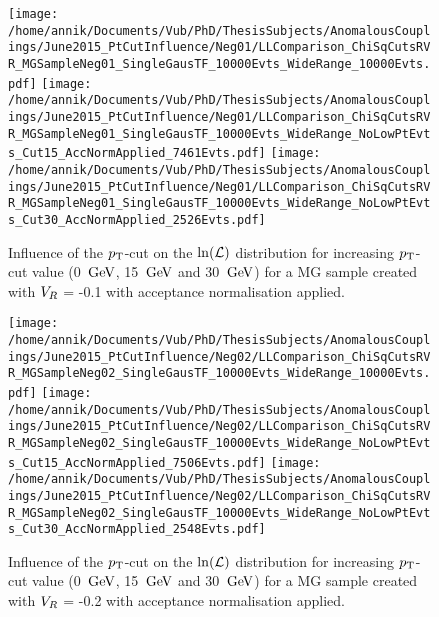 \begin{figure}[h!t]
 \centering
 \texttt{[image: /home/annik/Documents/Vub/PhD/ThesisSubjects/AnomalousCouplings/June2015\_PtCutInfluence/Neg01/LLComparison\_ChiSqCutsRVR\_MGSampleNeg01\_SingleGausTF\_10000Evts\_WideRange\_10000Evts.pdf]}
 \texttt{[image: /home/annik/Documents/Vub/PhD/ThesisSubjects/AnomalousCouplings/June2015\_PtCutInfluence/Neg01/LLComparison\_ChiSqCutsRVR\_MGSampleNeg01\_SingleGausTF\_10000Evts\_WideRange\_NoLowPtEvts\_Cut15\_AccNormApplied\_7461Evts.pdf]}
 \texttt{[image: /home/annik/Documents/Vub/PhD/ThesisSubjects/AnomalousCouplings/June2015\_PtCutInfluence/Neg01/LLComparison\_ChiSqCutsRVR\_MGSampleNeg01\_SingleGausTF\_10000Evts\_WideRange\_NoLowPtEvts\_Cut30\_AccNormApplied\_2526Evts.pdf]}
 \caption{Influence of the $p_{\textrm T}$-cut on the $\ln(\mathcal{L})$ distribution for increasing $p_{\textrm T}$-cut value (0 $\, \mathrm{GeV}$, 15 $\, \mathrm{GeV}$ and 30 $\, \mathrm{GeV}$) for a MG sample created with $V_{R}$ = -0.1 with acceptance normalisation applied.}
 \label{fig::AccNormNeg01}
\end{figure}

\begin{figure}[h!t]
 \centering
 \texttt{[image: /home/annik/Documents/Vub/PhD/ThesisSubjects/AnomalousCouplings/June2015\_PtCutInfluence/Neg02/LLComparison\_ChiSqCutsRVR\_MGSampleNeg02\_SingleGausTF\_10000Evts\_WideRange\_10000Evts.pdf]}
 \texttt{[image: /home/annik/Documents/Vub/PhD/ThesisSubjects/AnomalousCouplings/June2015\_PtCutInfluence/Neg02/LLComparison\_ChiSqCutsRVR\_MGSampleNeg02\_SingleGausTF\_10000Evts\_WideRange\_NoLowPtEvts\_Cut15\_AccNormApplied\_7506Evts.pdf]}
 \texttt{[image: /home/annik/Documents/Vub/PhD/ThesisSubjects/AnomalousCouplings/June2015\_PtCutInfluence/Neg02/LLComparison\_ChiSqCutsRVR\_MGSampleNeg02\_SingleGausTF\_10000Evts\_WideRange\_NoLowPtEvts\_Cut30\_AccNormApplied\_2548Evts.pdf]}
 \caption{Influence of the $p_{\textrm T}$-cut on the $\ln(\mathcal{L})$ distribution for increasing $p_{\textrm T}$-cut value (0 $\, \mathrm{GeV}$, 15 $\, \mathrm{GeV}$ and 30 $\, \mathrm{GeV}$) for a MG sample created with $V_{R}$ = -0.2 with acceptance normalisation applied.}
 \label{fig::AccNormNeg02}
\end{figure}

